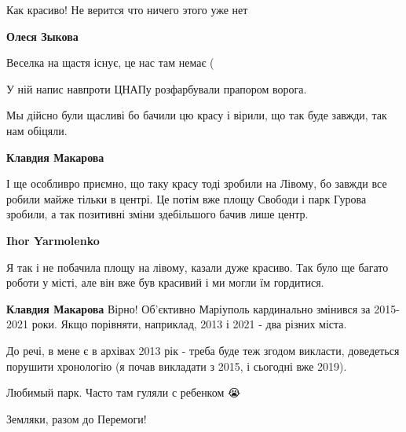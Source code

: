  
 
 
 
 

\qqSecCmt


Как красиво! Не верится что ничего этого уже нет

\begin{itemize} %
\textbf{Олеся Зыкова} 

Веселка на щастя існує, це нас там немає (

У ній напис навпроти ЦНАПу розфарбували прапором ворога.

\end{itemize} %


Мы дійсно були щасливі бо бачили цю красу і вірили, що так буде завжди, так нам
обіцяли.

\begin{itemize} %
\textbf{Клавдия Макарова} 

І ще особливро приємно, що таку красу тоді зробили на Лівому, бо завжди все
робили майже тільки в центрі. Це потім вже площу Свободи і парк Гурова зробили,
а так позитивні зміни здебільшого бачив лише центр.

\begin{itemize} %
\textbf{Ihor Yarmolenko} 

Я так і не побачила площу на лівому, казали дуже красиво. Так було ще багато
роботи у місті, але він вже був красивий і ми могли їм гордитися.

\textbf{Клавдия Макарова} Вірно! Об'єктивно Маріуполь кардинально змінився за 2015-2021 роки. Якщо порівняти, наприклад, 2013 і 2021 - два різних міста.


До речі, в мене є в архівах 2013 рік - треба буде теж згодом викласти,
доведеться порушити хронологію (я почав викладати з 2015, і сьогодні вже 2019).

\end{itemize} %

\end{itemize} %


Любимый парк. Часто там гуляли с ребенком 😭


Земляки, разом до Перемоги!
